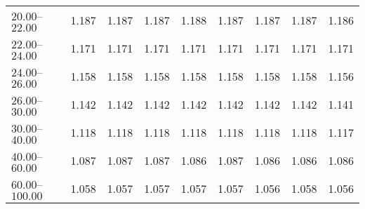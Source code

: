 \begin{table}[htp]
\begin{tiny}
\begin{center}
\begin{tabular}{|l|c|c|c|c|c|c|c|c|}
$20.00$--$22.00$ & 1.187 & 1.187 & 1.187 & 1.188 & 1.187 & 1.187 & 1.187 & 1.186  \\
$22.00$--$24.00$ & 1.171 & 1.171 & 1.171 & 1.171 & 1.171 & 1.171 & 1.171 & 1.171  \\
$24.00$--$26.00$ & 1.158 & 1.158 & 1.158 & 1.158 & 1.158 & 1.158 & 1.158 & 1.156  \\
$26.00$--$30.00$ & 1.142 & 1.142 & 1.142 & 1.142 & 1.142 & 1.142 & 1.142 & 1.141  \\
$30.00$--$40.00$ & 1.118 & 1.118 & 1.118 & 1.118 & 1.118 & 1.118 & 1.118 & 1.117  \\
$40.00$--$60.00$ & 1.087 & 1.087 & 1.087 & 1.086 & 1.087 & 1.086 & 1.086 & 1.086  \\
$60.00$--$100.00$ & 1.058 & 1.057 & 1.057 & 1.057 & 1.057 & 1.056 & 1.058 & 1.056  \\
\hline
\end{tabular} 
             \end{center} 
             \end{tiny} 
             \label{tab:sa_trpp_jpsi} 
             \end{table}


